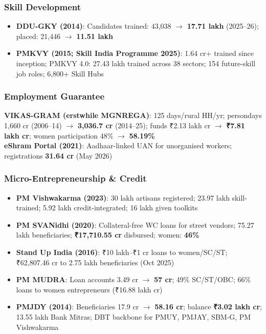 \subsubsection*{Skill Development}
\begin{itemize}
  \item \textbf{DDU-GKY (2014)}: Candidates trained: 43,038 $\rightarrow$ \textbf{17.71 lakh} (2025--26); placed: 21,446 $\rightarrow$ \textbf{11.51 lakh}
  \item \textbf{PMKVY (2015; Skill India Programme 2025)}: 1.64 cr+ trained since inception; PMKVY 4.0: 27.43 lakh trained across 38 sectors; 154 future-skill job roles; 6,800+ Skill Hubs
\end{itemize}

\subsubsection*{Employment Guarantee}
\textbf{VIKAS-GRAM (erstwhile MGNREGA)}: 125 days/rural HH/yr; persondays 1,660 cr (2006--14) $\rightarrow$ \textbf{3,036.7 cr} (2014--25); funds ₹2.13 lakh cr $\rightarrow$ \textbf{₹7.81 lakh cr}; women participation 48\% $\rightarrow$ \textbf{58.19\%}\\
\textbf{eShram Portal (2021)}: Aadhaar-linked UAN for unorganised workers; registrations \textbf{31.64 cr} (May 2026)

\subsubsection*{Micro-Entrepreneurship \& Credit}
\begin{itemize}
  \item \textbf{PM Vishwakarma (2023)}: 30 lakh artisans registered; 23.97 lakh skill-trained; 5.92 lakh credit-integrated; 16 lakh given toolkits
  \item \textbf{PM SVANidhi (2020)}: Collateral-free WC loans for street vendors; 75.27 lakh beneficiaries; \textbf{₹17,710.55 cr} disbursed; women: \textbf{46\%}
  \item \textbf{Stand Up India (2016)}: ₹10 lakh--₹1 cr loans to women/SC/ST; ₹62,807.46 cr to 2.75 lakh beneficiaries (Oct 2025)
  \item \textbf{PM MUDRA}: Loan accounts 3.49 cr $\rightarrow$ \textbf{57 cr}; 49\% SC/ST/OBC; 66\% loans to women entrepreneurs (₹16.88 lakh cr)
  \item \textbf{PMJDY (2014)}: Beneficiaries 17.9 cr $\rightarrow$ \textbf{58.16 cr}; balance \textbf{₹3.02 lakh cr}; 13.55 lakh Bank Mitras; DBT backbone for PMUY, PMJAY, SBM-G, PM Vishwakarma
\end{itemize}

